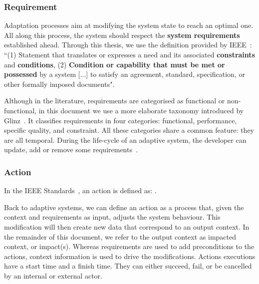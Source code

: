 \subsubsection{Requirement}
\label{sec:adaptation-req}

Adaptation processes aim at modifying the system state to reach an optimal one.
All along this process, the system should respect the \textbf{system requirements} established ahead. 
Through this thesis, we use the definition provided by IEEE~\cite{iso2017systems}: ``(1) Statement that translates or expresses a need and its associated \textbf{constraints} and \textbf{conditions}, (2) \textbf{Condition or capability that must be met or possessed} by a system [...] to satisfy an agreement, standard, specification, or other formally imposed documents".

Although in the literature, requirements are categorised as functional or non-func\-tional, in this document we use a more elaborate taxonomy introduced by Glinz~\cite{DBLP:conf/re/Glinz07}.
It classifies requirements in four categories: functional, performance, specific quality, and constraint.
All these categories share a common feature: they are all temporal.
During the life-cycle of an adaptive system, the developer can update, add or remove some requirements~\cite{DBLP:conf/icse/ChengA07, pandey2010effective}.

\subsubsection{Action}
In the IEEE Standards~\cite{iso2017systems}, an action is defined as: .

Back to adaptive systems, we can define an action as a process that, given the context and requirements as input, adjusts the system behaviour.
This modification will then create new data that correspond to an output context. In the remainder of this document, we refer to the output context as impacted context, or impact(s).
Whereas requirements are used to add preconditions to the actions, context information is used to drive the modifications.
Actions executions have a start time and a finish time. They can either succeed, fail, or be cancelled by an internal or external actor.

